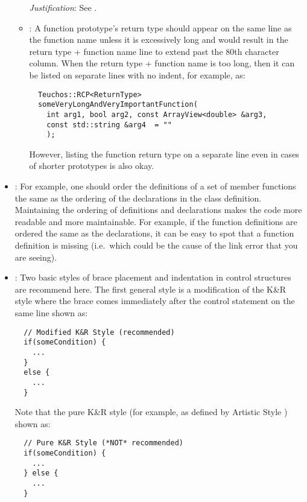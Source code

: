 \begin{itemize}
\begin{itemize}
  {}\textit{Justification}: See {}\cite[Section 31.1]{CodeComplete2nd04}.
  
  {}\item\FSCFunctionReturn: A function prototype's return type should appear
  on the same line as the function name unless it is excessively long and
  would result in the return type + function name line to extend past the 80th
  character column.  When the return type + function name is too long, then it
  can be listed on separate lines with no indent, for example, as:
  
  {\small\begin{verbatim}
  Teuchos::RCP<ReturnType>
  someVeryLongAndVeryImportantFunction(
    int arg1, bool arg2, const ArrayView<double> &arg3,
    const std::string &arg4  = ""
    );
  \end{verbatim}}

  However, listing the function return type on a separate line even in cases
  of shorter prototypes is also okay.

  \end{itemize}


{}\item\FSCOrderFunctionDefinitions: For example, one should order the
definitions of a set of member functions the same as the ordering of the
declarations in the class definition.  Maintaining the ordering of definitions
and declarations makes the code more readable and more maintainable.  For
example, if the function definitions are ordered the same as the declarations,
it can be easy to spot that a function definition is missing (i.e.\ which
could be the cause of the link error that you are seeing).


{}\item\FSCBracePlacement: Two basic styles of brace placement and indentation
in control structures are recommend here.  The first general style is a
modification of the K\&R style{}\cite{ArtisticStyle} where the brace comes
immediately after the control statement on the same line shown as:

{\small\begin{verbatim}
  // Modified K&R Style (recommended)
  if(someCondition) {
    ...
  }
  else {
    ...
  }
\end{verbatim}}

Note that the pure K\&R style (for example, as defined by Artistic Style
{}\cite{ArtisticStyle}) shown as:

{\small\begin{verbatim}
  // Pure K&R Style (*NOT* recommended)
  if(someCondition) {
    ...
  } else {
    ...
  }
\end{verbatim}}


\end{itemize}
